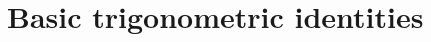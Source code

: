 \documentclass[a4paper,twoside, 11pt]{article}
\begin{document}
\section*{Basic trigonometric identities}












\end{document}
